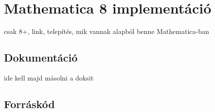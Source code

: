 \section{Mathematica 8 implementáció}
csak 8+, link, telepítés, mik vannak alapból benne Mathematica-ban

\subsection{Dokumentáció}
ide kell majd másolni a doksit

\subsection{Forráskód}
\lstset{
	language=Mathematica,
	tabsize=2,
	breaklines=true,
	basicstyle=\footnotesize,
	numbers=left,
	numberstyle=\footnotesize
}


